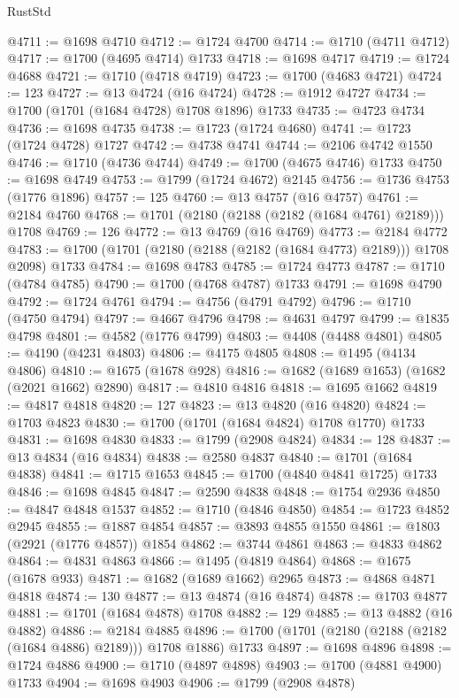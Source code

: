 \begin{lexlean}{RustStd}
\begin{coremodule}
@4711 := @1698 @4710
@4712 := @1724 @4700
@4714 := @1710 (@4711 @4712)
@4717 := @1700 (@4695 @4714) @1733
@4718 := @1698 @4717
@4719 := @1724 @4688
@4721 := @1710 (@4718 @4719)
@4723 := @1700 (@4683 @4721)
@4724 := 123
@4727 := @13 @4724 (@16 @4724)
@4728 := @1912 @4727
@4734 := @1700 (@1701 (@1684 @4728) @1708 @1896) @1733
@4735 := @4723 @4734
@4736 := @1698 @4735
@4738 := @1723 (@1724 @4680)
@4741 := @1723 (@1724 @4728) @1727
@4742 := @4738 @4741
@4744 := @2106 @4742 @1550
@4746 := @1710 (@4736 @4744)
@4749 := @1700 (@4675 @4746) @1733
@4750 := @1698 @4749
@4753 := @1799 (@1724 @4672) @2145
@4756 := @1736 @4753 (@1776 @1896)
@4757 := 125
@4760 := @13 @4757 (@16 @4757)
@4761 := @2184 @4760
@4768 := @1701 (@2180 (@2188 (@2182 (@1684 @4761) @2189))) @1708
@4769 := 126
@4772 := @13 @4769 (@16 @4769)
@4773 := @2184 @4772
@4783 := @1700 (@1701 (@2180 (@2188 (@2182 (@1684 @4773) @2189))) @1708 @2098) @1733
@4784 := @1698 @4783
@4785 := @1724 @4773
@4787 := @1710 (@4784 @4785)
@4790 := @1700 (@4768 @4787) @1733
@4791 := @1698 @4790
@4792 := @1724 @4761
@4794 := @4756 (@4791 @4792)
@4796 := @1710 (@4750 @4794)
@4797 := @4667 @4796
@4798 := @4631 @4797
@4799 := @1835 @4798
@4801 := @4582 (@1776 @4799)
@4803 := @4408 (@4488 @4801)
@4805 := @4190 (@4231 @4803)
@4806 := @4175 @4805
@4808 := @1495 (@4134 @4806)
@4810 := @1675 (@1678 @928)
@4816 := @1682 (@1689 @1653) (@1682 (@2021 @1662) @2890)
@4817 := @4810 @4816
@4818 := @1695 @1662
@4819 := @4817 @4818
@4820 := 127
@4823 := @13 @4820 (@16 @4820)
@4824 := @1703 @4823
@4830 := @1700 (@1701 (@1684 @4824) @1708 @1770) @1733
@4831 := @1698 @4830
@4833 := @1799 (@2908 @4824)
@4834 := 128
@4837 := @13 @4834 (@16 @4834)
@4838 := @2580 @4837
@4840 := @1701 (@1684 @4838)
@4841 := @1715 @1653
@4845 := @1700 (@4840 @4841 @1725) @1733
@4846 := @1698 @4845
@4847 := @2590 @4838
@4848 := @1754 @2936
@4850 := @4847 @4848 @1537
@4852 := @1710 (@4846 @4850)
@4854 := @1723 @4852 @2945
@4855 := @1887 @4854
@4857 := @3893 @4855 @1550
@4861 := @1803 (@2921 (@1776 @4857)) @1854
@4862 := @3744 @4861
@4863 := @4833 @4862
@4864 := @4831 @4863
@4866 := @1495 (@4819 @4864)
@4868 := @1675 (@1678 @933)
@4871 := @1682 (@1689 @1662) @2965
@4873 := @4868 @4871 @4818
@4874 := 130
@4877 := @13 @4874 (@16 @4874)
@4878 := @1703 @4877
@4881 := @1701 (@1684 @4878) @1708
@4882 := 129
@4885 := @13 @4882 (@16 @4882)
@4886 := @2184 @4885
@4896 := @1700 (@1701 (@2180 (@2188 (@2182 (@1684 @4886) @2189))) @1708 @1886) @1733
@4897 := @1698 @4896
@4898 := @1724 @4886
@4900 := @1710 (@4897 @4898)
@4903 := @1700 (@4881 @4900) @1733
@4904 := @1698 @4903
@4906 := @1799 (@2908 @4878)

\end{coremodule}
\end{lexlean}
